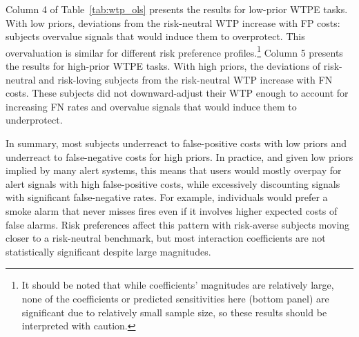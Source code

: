 \documentclass[12pt,a4paper]{article}
\newcommand{\agt}[1]{{\color{OliveGreen}#1}}
\newcommand{\aut}[1]{{\color{Red}#1}}
\begin{document}
Column 4 of Table~\ref{tab:wtp_ols} presents the results for low-prior WTPE tasks. With low priors, deviations from the risk-neutral WTP increase with FP costs: subjects overvalue signals that would induce them to overprotect. This overvaluation is similar for different risk preference profiles.\footnote{It should be noted that while coefficients' magnitudes are relatively large, none of the coefficients or predicted sensitivities here (bottom panel) are significant due to relatively small sample size, so these results should be interpreted with caution.}  Column 5 presents the results for high-prior WTPE tasks. With high priors, the deviations of risk-neutral and risk-loving subjects from the risk-neutral WTP increase with FN costs. These subjects did not downward-adjust their WTP enough to account for increasing FN rates and overvalue signals that would induce them to underprotect. 

In summary, most subjects underreact to false-positive costs with low priors and underreact to false-negative costs for high priors. In practice, and given low priors implied by many alert systems, this means that users would mostly overpay for alert signals with high false-positive costs, while excessively discounting signals with significant false-negative rates. For example, individuals would prefer a smoke alarm that never misses fires even if it involves higher expected costs of false alarms. Risk preferences affect this pattern with risk-averse subjects moving closer to a risk-neutral benchmark, but most interaction coefficients are not statistically significant despite large magnitudes.




\end{document}
